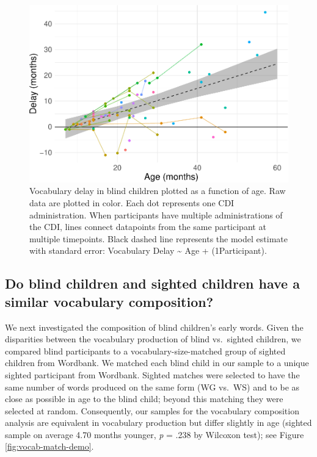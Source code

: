 \documentclass[
  man,floatsintext]{apa6}
\begin{document}
\begin{figure}
\centering
\includegraphics{VI_CDI_manuscript_files/figure-latex/longitudinal-plot-1.pdf}
\caption{\label{fig:longitudinal-plot}Vocabulary delay in blind children plotted as a function of age. Raw data are plotted in color. Each dot represents one CDI administration. When participants have multiple administrations of the CDI, lines connect datapoints from the same participant at multiple timepoints. Black dashed line represents the model estimate with standard error: Vocabulary Delay \textasciitilde{} Age + (1\textbar Participant).}
\end{figure}

\hypertarget{do-blind-children-and-sighted-children-have-a-similar-vocabulary-composition}{%
\subsection{Do blind children and sighted children have a similar vocabulary composition?}\label{do-blind-children-and-sighted-children-have-a-similar-vocabulary-composition}}

We next investigated the composition of blind children's early words. Given the disparities between the vocabulary production of blind vs.~sighted children, we compared blind participants to a vocabulary-size-matched group of sighted children from Wordbank. We matched each blind child in our sample to a unique sighted participant from Wordbank. Sighted matches were selected to have the same number of words produced on the same form (WG vs.~WS) and to be as close as possible in age to the blind child; beyond this matching they were selected at random. Consequently, our samples for the vocabulary composition analysis are equivalent in vocabulary production but differ slightly in age (sighted sample on average 4.70 months younger, \emph{p} = .238 by Wilcoxon test); see Figure \ref{fig:vocab-match-demo}.
\end{document}
